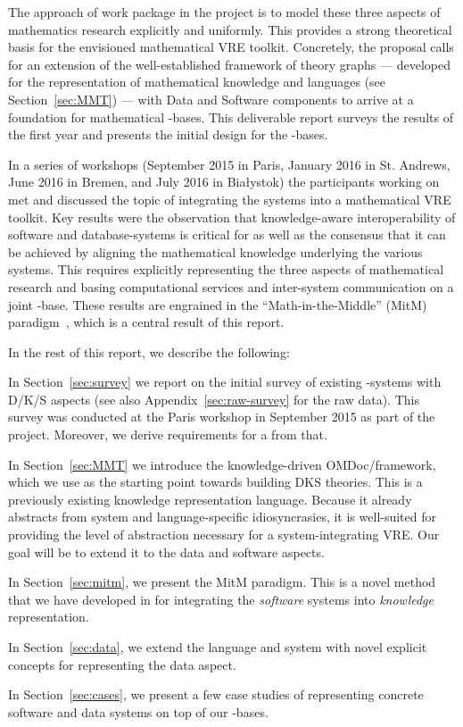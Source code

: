 The approach of work package  in the \pn project is to model these three
aspects of mathematics research explicitly and uniformly.
This provides a strong theoretical basis for the envisioned mathematical
VRE toolkit. Concretely, the \pn proposal calls for an extension of the well-established
framework of theory graphs --- developed for the representation of mathematical knowledge
and languages (see Section~\ref{sec:MMT}) --- with Data and Software components to arrive
at a foundation for mathematical \DKS-bases. This deliverable report surveys
the results of the first year and presents the initial design for the
\DKS-bases.

In a series of workshops (September 2015 in Paris, January 2016 in St. Andrews, June 2016
in Bremen, and July 2016 in Bia{\l}ystok) the participants working on  met
and discussed the topic of integrating the \pn systems into a mathematical VRE toolkit.
Key results were the observation that knowledge-aware interoperability of software and database-systems is critical
for \pn as well as the consensus that it can be achieved by aligning the mathematical knowledge underlying
the various systems.
This requires explicitly representing the three aspects of mathematical research and basing
computational services and inter-system communication on a joint \DKS-base.
These results are engrained in the ``Math-in-the-Middle'' (MitM)
paradigm~\cite{DehKohKon:iop16}, which is a central result of this report.

In the rest of this report, we describe the following:
\begin{compactenum}
\item In Section~\ref{sec:survey} we report on the initial survey of existing \pn-systems with
D/K/S aspects (see also Appendix~\ref{sec:raw-survey} for the raw data).
This survey was conducted at the Paris workshop in September 2015 as part of the \pn project.
Moreover, we derive requirements for a from that.
\item In Section~\ref{sec:MMT} we introduce the knowledge-driven OMDoc/\MMT framework, which we use as the
  starting point towards building DKS theories.
  This is a previously existing knowledge representation language.
  Because it already abstracts from system and language-specific idiosyncrasies, it is well-suited for providing the level of abstraction necessary for a system-integrating VRE.
  Our goal will be to extend it to the data and software aspects.
\item In Section~\ref{sec:mitm}, we present the MitM paradigm.
  This is a novel method that we have developed in \pn for integrating the \emph{software} systems into \emph{knowledge} representation.
\item In Section~\ref{sec:data}, we extend the \MMT language and system with novel explicit concepts for representing the data aspect.
\item In Section~\ref{sec:cases}, we present a few case studies of representing concrete software and data systems on top of our \DKS-bases.
\end{compactenum}

